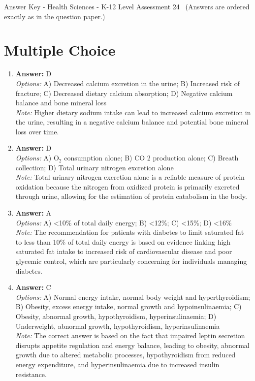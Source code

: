 \documentclass[12pt]{article}
\begin{document}
\begin{center}
Answer Key - Health Sciences - K-12 Level Assessment 24 \
\small (Answers are ordered exactly as in the question paper.)
\end{center}

\section*{Multiple Choice}
\begin{enumerate}[label=\arabic*.]
\item \textbf{Answer:} D
\\ \textit{Options:} A) Decreased calcium excretion in the urine; B) Increased risk of fracture; C) Decreased dietary calcium absorption; D) Negative calcium balance and bone mineral loss
\\ \textit{Note:} Higher dietary sodium intake can lead to increased calcium excretion in the urine, resulting in a negative calcium balance and potential bone mineral loss over time.
\item \textbf{Answer:} D
\\ \textit{Options:} A) O$_{2}$ consumption alone; B) CO 2 production alone; C) Breath collection; D) Total urinary nitrogen excretion alone
\\ \textit{Note:} Total urinary nitrogen excretion alone is a reliable measure of protein oxidation because the nitrogen from oxidized protein is primarily excreted through urine, allowing for the estimation of protein catabolism in the body.
\item \textbf{Answer:} A
\\ \textit{Options:} A) \textless{}10\% of total daily energy; B) \textless{}12\%; C) \textless{}15\%; D) \textless{}16\%
\\ \textit{Note:} The recommendation for patients with diabetes to limit saturated fat to less than 10\% of total daily energy is based on evidence linking high saturated fat intake to increased risk of cardiovascular disease and poor glycemic control, which are particularly concerning for individuals managing diabetes.
\item \textbf{Answer:} C
\\ \textit{Options:} A) Normal energy intake, normal body weight and hyperthyroidism; B) Obesity, excess energy intake, normal growth and hypoinsulinaemia; C) Obesity, abnormal growth, hypothyroidism, hyperinsulinaemia; D) Underweight, abnormal growth, hypothyroidism, hyperinsulinaemia
\\ \textit{Note:} The correct answer is based on the fact that impaired leptin secretion disrupts appetite regulation and energy balance, leading to obesity, abnormal growth due to altered metabolic processes, hypothyroidism from reduced energy expenditure, and hyperinsulinaemia due to increased insulin resistance.

\end{enumerate}
\end{document}
